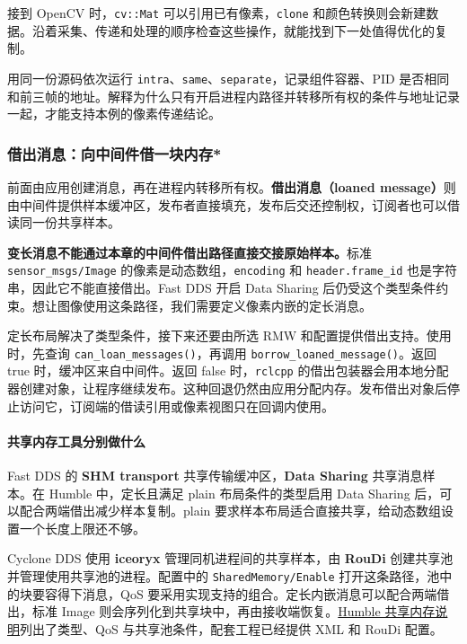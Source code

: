 接到 OpenCV 时，\texttt{cv::Mat} 可以引用已有像素，\texttt{clone} 和颜色转换则会新建数据。沿着采集、传递和处理的顺序检查这些操作，就能找到下一处值得优化的复制。

\begin{exercise}
\label{ex:v2-ros-components}
用同一份源码依次运行 \texttt{intra}、\texttt{same}、\texttt{separate}，记录组件容器、PID 是否相同和前三帧的地址。解释为什么只有开启进程内路径并转移所有权的条件与地址记录一起，才能支持本例的像素传递结论。
\end{exercise}

\subsubsection{借出消息：向中间件借一块内存*}
\label{sec:ros2-loaned-messages}
前面由应用创建消息，再在进程内转移所有权。\textbf{借出消息（loaned message）}则由中间件提供样本缓冲区，发布者直接填充，发布后交还控制权，订阅者也可以借读同一份共享样本。

\textbf{变长消息不能通过本章的中间件借出路径直接交接原始样本。}标准 \texttt{sensor\_msgs/Image} 的像素是动态数组，\texttt{encoding} 和 \texttt{header.frame\_id} 也是字符串，因此它不能直接借出。Fast DDS 开启 Data Sharing 后仍受这个类型条件约束。想让图像使用这条路径，我们需要定义像素内嵌的定长消息。

定长布局解决了类型条件，接下来还要由所选 RMW 和配置提供借出支持。使用时，先查询 \texttt{can\_loan\_messages()}，再调用 \texttt{borrow\_loaned\_message()}。返回 true 时，缓冲区来自中间件。返回 false 时，\texttt{rclcpp} 的借出包装器会用本地分配器创建对象，让程序继续发布。这种回退仍然由应用分配内存。发布借出对象后停止访问它，订阅端的借读引用或像素视图只在回调内使用。

\paragraph*{共享内存工具分别做什么}
Fast DDS 的 \textbf{SHM transport} 共享传输缓冲区，\textbf{Data Sharing} 共享消息样本。在 Humble 中，定长且满足 plain 布局条件的类型启用 Data Sharing 后，可以配合两端借出减少样本复制。plain 要求样本布局适合直接共享，给动态数组设置一个长度上限还不够。

Cyclone DDS 使用 \textbf{iceoryx} 管理同机进程间的共享样本，由 \textbf{RouDi} 创建共享池并管理使用共享池的进程。配置中的 \texttt{SharedMemory/Enable} 打开这条路径，池中的块要容得下消息，QoS 要采用实现支持的组合。定长内嵌消息可以配合两端借出，标准 Image 则会序列化到共享块中，再由接收端恢复。\href{https://github.com/ros2/rmw_cyclonedds/blob/humble/shared_memory_support.md}{Humble 共享内存说明}列出了类型、QoS 与共享池条件，配套工程已经提供 XML 和 RouDi 配置。

